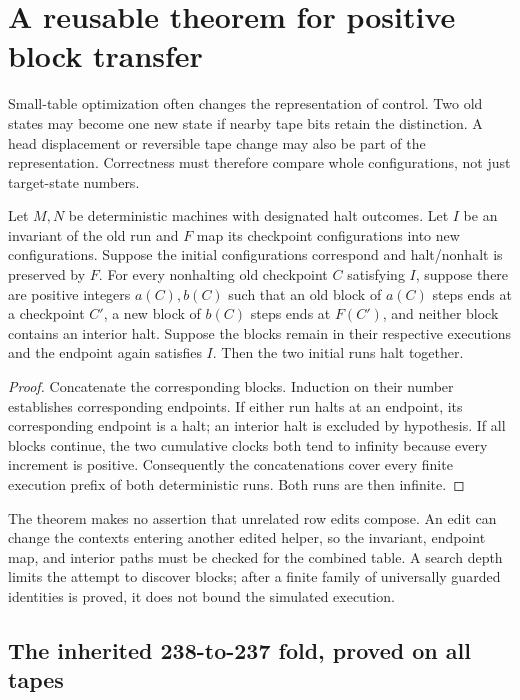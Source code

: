 \section{A reusable theorem for positive block transfer}
\label{sec:blocks}

Small-table optimization often changes the representation of control.
Two old states may become one new state if nearby tape bits retain the
distinction.  A head displacement or reversible tape change may also
be part of the representation.  Correctness must therefore compare
whole configurations, not just target-state numbers.

\begin{theorem}
Let $M,N$ be deterministic machines with designated halt outcomes.
Let $I$ be an invariant of the old run and $F$ map its checkpoint
configurations into new configurations.  Suppose the initial
configurations correspond and halt/nonhalt is preserved by $F$.
For every nonhalting old checkpoint $C$ satisfying $I$, suppose there
are positive integers $a(C),b(C)$ such that an old block of $a(C)$
steps ends at a checkpoint $C'$, a new block of $b(C)$ steps ends
at $F(C')$, and neither block contains an interior halt.  Suppose
the blocks remain in their respective executions and the endpoint
again satisfies $I$.  Then the two initial runs halt together.
\end{theorem}

\begin{proof}
Concatenate the corresponding blocks.  Induction on their number
establishes corresponding endpoints.  If either run halts at an
endpoint, its corresponding endpoint is a halt; an interior halt is
excluded by hypothesis.  If all blocks continue, the two cumulative
clocks both tend to infinity because every increment is positive.
Consequently the concatenations cover every finite execution prefix
of both deterministic runs.  Both runs are then infinite.
\end{proof}

The theorem makes no assertion that unrelated row edits compose.
An edit can change the contexts entering another edited helper, so
the invariant, endpoint map, and interior paths must be checked for
the combined table.  A search depth limits the attempt to discover
blocks; after a finite family of universally guarded identities is
proved, it does not bound the simulated execution.

\subsection{The inherited 238-to-237 fold, proved on all tapes}

